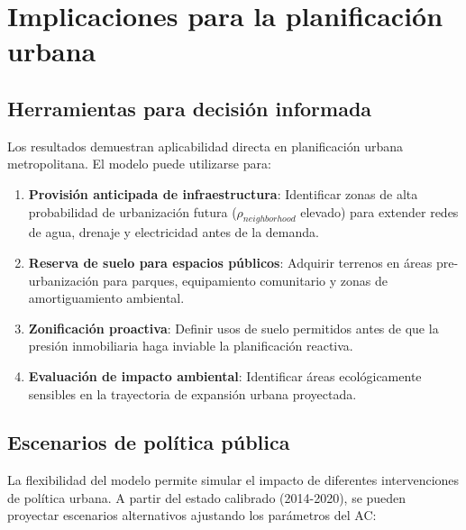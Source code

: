 \section{Implicaciones para la planificación urbana}

\subsection{Herramientas para decisión informada}

Los resultados demuestran aplicabilidad directa en planificación urbana metropolitana. El modelo puede utilizarse para:

\begin{enumerate}
	\item \textbf{Provisión anticipada de infraestructura}: Identificar zonas de alta probabilidad de urbanización futura ($\rho_{neighborhood}$ elevado) para extender redes de agua, drenaje y electricidad antes de la demanda.

	\item \textbf{Reserva de suelo para espacios públicos}: Adquirir terrenos en áreas pre-urbanización para parques, equipamiento comunitario y zonas de amortiguamiento ambiental.

	\item \textbf{Zonificación proactiva}: Definir usos de suelo permitidos antes de que la presión inmobiliaria haga inviable la planificación reactiva.

	\item \textbf{Evaluación de impacto ambiental}: Identificar áreas ecológicamente sensibles en la trayectoria de expansión urbana proyectada.
\end{enumerate}

\subsection{Escenarios de política pública}

La flexibilidad del modelo permite simular el impacto de diferentes intervenciones de política urbana. A partir del estado calibrado (2014-2020), se pueden proyectar escenarios alternativos ajustando los parámetros del AC:

